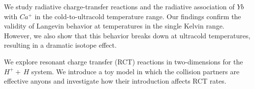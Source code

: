 We study radiative charge-transfer reactions and the radiative association of $Yb$ with $Ca^{+}$ in the cold-to-ultracold temperature range. Our findings confirm the validity of Langevin behavior at temperatures in the single Kelvin range. However, we also show that this behavior breaks down at ultracold temperatures, resulting in a dramatic isotope effect.

We explore resonant charge transfer (RCT) reactions in two-dimensions for the $ H^{+} +\, H$ system. We introduce a toy model in which the collision partners are effective anyons and investigate how their introduction affects RCT rates.
 
